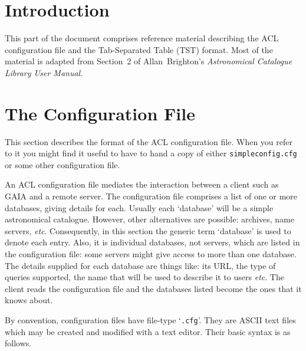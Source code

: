 \documentclass[twoside,11pt]{article}
\newcommand{\xref}[3]{#1}
\newcommand{\xlabel}[1]{}
\renewcommand{\_}{\texttt{\symbol{95}}}
\begin{document}
\section{\xlabel{INTRO_R}\label{INTRO_R}Introduction}

This part of the document comprises reference material describing
the ACL configuration file and the Tab-Separated Table (TST) format.
Most of the material is adapted from Section~2 of Allan~Brighton's {\it
Astronomical Catalogue Library User Manual}\/\cite{BRIGHTON98}.


\section{\xlabel{CONFIG_R}\label{CONFIG_R}The Configuration File}

This section describes the format of the ACL configuration file.  When
you refer to it you might find it useful to have to hand a copy of
either {\tt simpleconfig.cfg} or some other configuration file.

An ACL configuration file mediates the interaction between 
a client such as \xref{GAIA}{sun214}{} and a remote server.  
The configuration file comprises a list of one or more databases,
giving details for each.  Usually each `database' will be a simple
astronomical catalogue.  However, other alternatives are possible:
archives, name servers, \emph{etc}.  Consequently, in this section the
generic term `database' is used to denote each entry.  Also, it is
individual databases, not servers, which are listed in the configuration
file: some servers might give access to more than one database.
The details supplied for each database are things like: its URL, the
type of queries supported, the name that will be used to describe it to
users \emph{etc}.  The client reads the configuration file and the
databases listed become the ones that it knows about.

By convention, configuration files have file-type `{\tt .cfg}'.
They are ASCII text files which may be created and modified with a text
editor.  Their basic syntax is as follows.
\end{document}
